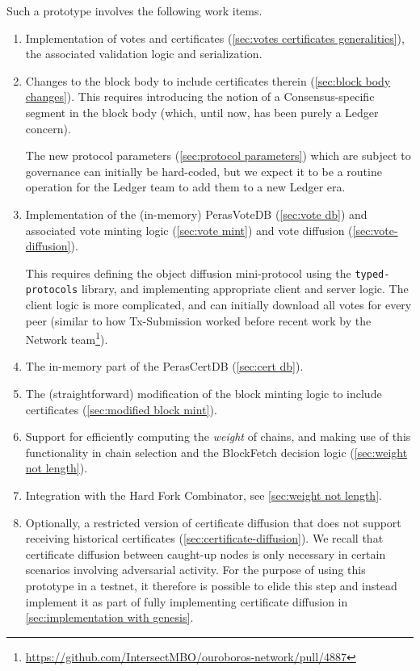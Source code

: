 Such a prototype involves the following work items.
\begin{enumerate}
\item\label{enumi:proto no certs:1}
  Implementation of votes and certificates (\cref{sec:votes certificates generalities}), the associated validation logic and serialization.
\item\label{enumi:proto no certs:2}
  Changes to the block body to include certificates therein (\cref{sec:block body changes}).
  This requires introducing the notion of a Consensus-specific segment in the block body (which, until now, has been purely a Ledger concern).

  The new protocol parameters (\cref{sec:protocol parameters}) which are subject to governance can initially be hard-coded, but we expect it to be a routine operation for the Ledger team to add them to a new Ledger era.
\item\label{enumi:proto no certs:3}
  Implementation of the (in-memory) PerasVoteDB (\cref{sec:vote db}) and associated vote minting logic (\cref{sec:vote mint}) and vote diffusion (\cref{sec:vote-diffusion}).

  This requires defining the object diffusion mini-protocol using the \texttt{typed-protocols} library, and implementing appropriate client and server logic.
  The client logic is more complicated, and can initially download all votes for every peer (similar to how Tx-Submission worked before recent work by the Network team\footnote{\url{https://github.com/IntersectMBO/ouroboros-network/pull/4887}}).
\item\label{enumi:proto no certs:4}
  The in-memory part of the PerasCertDB (\cref{sec:cert db}).
\item\label{enumi:proto no certs:5}
  The (straightforward) modification of the block minting logic to include certificates (\cref{sec:modified block mint}).
\item\label{enumi:proto no certs:6}
  Support for efficiently computing the \emph{weight} of chains, and making use of this functionality in chain selection and the BlockFetch decision logic (\cref{sec:weight not length}).
\item\label{enumi:proto no certs:7}
  Integration with the Hard Fork Combinator, see \cref{sec:weight not length}.
\item\label{enumi:proto no certs:8}
  Optionally, a restricted version of certificate diffusion that does not support receiving historical certificates (\cref{sec:certificate-diffusion}).
  We recall that certificate diffusion between caught-up nodes is only necessary in certain scenarios involving adversarial activity.
  For the purpose of using this prototype in a testnet, it therefore is possible to elide this step and instead implement it as part of fully implementing certificate diffusion in \cref{sec:implementation with genesis}.
\end{enumerate}

